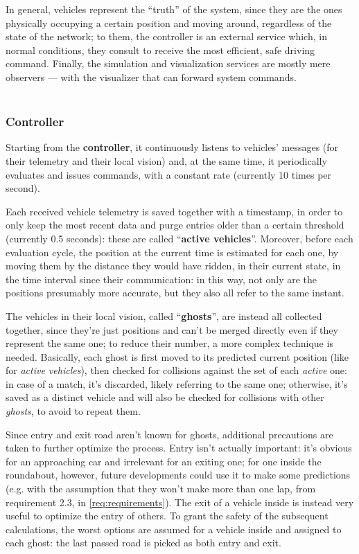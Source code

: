 In general, vehicles represent the ``truth'' of the system, since they are the
ones physically occupying a certain position and moving around, regardless of
the state of the network; to them, the controller is an external service which,
in normal conditions, they consult to receive the most efficient, safe driving
command. Finally, the simulation and visualization services are mostly mere
observers --- with the visualizer that can forward system commands.
\\
\\
\subsubsection{Controller}\label{arch:behaviour_controller}
Starting from the \textbf{controller}, it continuously listens to vehicles'
messages (for their telemetry and their local vision) and, at the same time, it
periodically evaluates and issues commands, with a constant rate (currently 10
times per second).

Each received vehicle telemetry is saved together with a timestamp, in order to
only keep the most recent data and purge entries older than a certain threshold
(currently 0.5 seconds): these are called ``\textbf{active vehicles}''.
Moreover, before each evaluation cycle, the position at the current time is
estimated for each one,  by moving them by the distance they would have ridden,
in their current state, in the time interval since their communication: in this
way, not only are the positions presumably more accurate, but they also all
refer to the same instant.

The vehicles in their local vision, called ``\textbf{ghosts}'', are instead all
collected together, since they're just positions and can't be merged directly
even if they represent the same one; to reduce their number, a more complex
technique is needed. Basically, each ghost is first moved to its predicted
current position (like for \textit{active vehicles}), then checked for
collisions against the set of each \textit{active} one: in case of a match, it's
discarded, likely referring to the same one; otherwise, it's saved as a distinct
vehicle and will also be checked for collisions with other \textit{ghosts}, to
avoid to repeat them.

Since entry and exit road aren't known for ghosts, additional precautions are
taken to further optimize the process. Entry isn't actually important: it's
obvious for an approaching car and irrelevant for an exiting one; for one inside
the roundabout, however, future developments could use it to make some
predictions (e.g. with the assumption that they won't make more than one lap,
from requirement 2.3, in \ref{req:requirements}). The exit of a vehicle inside
is instead very useful to optimize the entry of others. To grant the safety of
the subsequent calculations, the worst options are assumed for a vehicle inside
and assigned to each ghost: the last passed road is picked as both entry and
exit.

